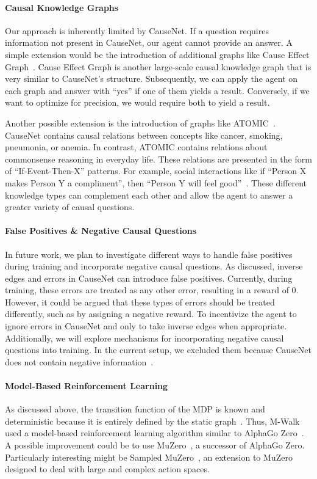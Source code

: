 \paragraph{Causal Knowledge Graphs}
Our approach is inherently limited by CauseNet.
If a question requires information not present in CauseNet, our agent cannot provide an answer.
A simple extension would be the introduction of additional graphs 
like Cause Effect Graph~\cite{Li2020CauseEffectGraph}. Cause Effect Graph is another 
large-scale causal knowledge graph that is very similar to CauseNet's structure.
Subsequently, we can apply the agent on each 
graph and answer with ``yes'' if one of them yields a result. Conversely, if we want to optimize for 
precision, we would require both to yield a result.

Another possible extension is the introduction of graphs like ATOMIC~\cite{Sap2019ATOMIC}.
CauseNet contains causal relations between concepts like cancer, smoking, pneumonia, or anemia.
In contrast, ATOMIC contains relations about commonsense reasoning in everyday life.
These relations are presented in the form of ``If-Event-Then-X'' patterns. For example, social interactions like 
if ``Person X makes Person Y a compliment'', then ``Person Y will feel good''~\cite{Sap2019ATOMIC}.
These different knowledge types can complement each other and allow the agent to answer a 
greater variety of causal questions. 


\paragraph{False Positives \& Negative Causal Questions}
In future work, we plan to investigate different ways to handle false positives during training and incorporate negative causal questions.
As discussed, inverse edges and errors in CauseNet can introduce false positives.
Currently, during training, these errors are treated as any other error, resulting in a reward of 0. 
However, it could be argued that these types of errors should be treated differently, such as by assigning a negative reward.
To incentivize the agent to ignore errors in CauseNet and only to take inverse edges when appropriate.
Additionally, we will explore mechanisms for incorporating negative causal questions into training.
In the current setup, we excluded them because CauseNet does not contain negative information~\cite{Heindorf2020Causenet}.

\paragraph{Model-Based Reinforcement Learning}
As discussed above, the transition function of the MDP is known and deterministic because it is entirely defined by the static graph~\cite{Shen2018MWalk}.
Thus, M-Walk~\cite{Shen2018MWalk} used a model-based reinforcement learning algorithm similar to AlphaGo Zero~\cite{Silver2017AlphaGoZero}.
A possible improvement could be to use MuZero~\cite{Schrittwieser2020Muzero}, a successor of AlphaGo Zero.
Particularly interesting might be Sampled MuZero~\cite{Hubert2021Sampled}, an extension to MuZero designed to deal 
with large and complex action spaces.


